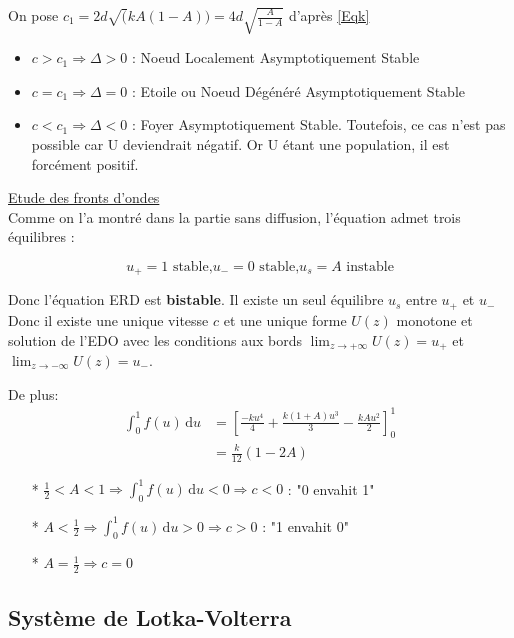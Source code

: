 \documentclass[a4paper,11pt]{article}
\begin{document}
\begin{itemize}[label=$\bullet$]
\begin{itemize}
\begin{itemize}[label=$\blacktriangleright$]
            On pose $c_1=2d\sqrt(kA(1-A))=4d\sqrt{\frac{A}{1-A}}$ d'après \eqref{Eqk}
            \begin{itemize}[label=$\rightarrow$]
				\item $c>c_1 \Rightarrow \Delta >0$ : Noeud Localement Asymptotiquement Stable
                \item $c=c_1 \Rightarrow \Delta =0$ : Etoile ou Noeud Dégénéré Asymptotiquement Stable
                \item $c<c_1 \Rightarrow \Delta <0$ : Foyer Asymptotiquement Stable. Toutefois, ce cas n'est pas possible car U deviendrait négatif. Or U étant une population, il est forcément positif.
			\end{itemize}
		\end{itemize}
	\end{itemize}
\end{itemize}

\noindent \underline{Etude des fronts d'ondes}\\
Comme on l'a montré dans la partie sans diffusion, l'équation admet trois équilibres :

$$u_+=1 \text{ stable,} u_-=0 \text{ stable,} u_s=A \text{ instable}$$
	
    Donc l'équation ERD est \textbf{bistable}. Il existe un seul équilibre $u_s$ entre $u_+$ et $u_-$ \\
    Donc il existe une unique vitesse $c$ et une unique forme $U(z)$ monotone et solution de l'EDO avec les conditions aux bords $\lim_{z \to +\infty} U(z)=u_+$ et $\lim_{z \to -\infty} U(z)=u_-$. 
    
    De plus: 
	\begin{align*}
		\int_{0}^1 f(u)\, \mathrm{d}u &=\left[\frac{-ku^4}{4}+\frac{k(1+A)u^3}{3}-\frac{kAu^2}{2}\right]_0^1\\
		&=\frac{k}{12}(1-2A)
	\end{align*}
    	\begin{itemize}
        	\item[*] $\frac{1}{2}<A<1 \Rightarrow \int_{0}^1 f(u)\, \mathrm{d}u<0 \Rightarrow c<0$ : "0 envahit 1"
            \item[*] $A<\frac{1}{2} \Rightarrow \int_{0}^1 f(u)\, \mathrm{d}u>0 \Rightarrow c>0$ : "1 envahit 0"
            \item[*] $A=\frac{1}{2} \Rightarrow c=0$
		\end{itemize}




\subsection{Système de Lotka-Volterra}
\end{document}

